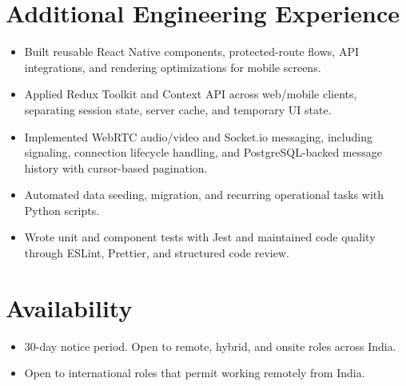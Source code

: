 \documentclass[11pt,a4paper,sans]{moderncv}
\begin{document}

\section{Additional Engineering Experience}
\vspace{1pt}
\begin{itemize}
\item {Built reusable React Native components, protected-route flows, API integrations, and rendering optimizations for mobile screens.}
\item {Applied Redux Toolkit and Context API across web/mobile clients, separating session state, server cache, and temporary UI state.}
\item {Implemented WebRTC audio/video and Socket.io messaging, including signaling, connection lifecycle handling, and PostgreSQL-backed message history with cursor-based pagination.}
\item {Automated data seeding, migration, and recurring operational tasks with Python scripts.}
\item {Wrote unit and component tests with Jest and maintained code quality through ESLint, Prettier, and structured code review.}
\end{itemize}

\section{Availability}
\begin{itemize}
\item {30-day notice period. Open to remote, hybrid, and onsite roles across India.}
\item {Open to international roles that permit working remotely from India.}
\end{itemize}


\end{document}
